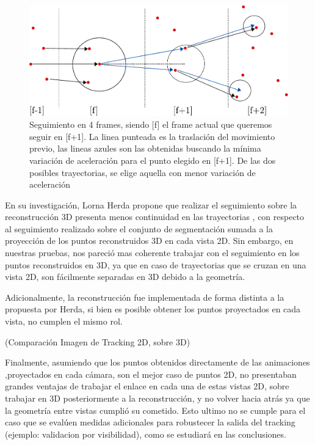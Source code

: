 \begin{figure}[hbt]
\begin{center}
\includegraphics[scale=0.8]{img/Tracking/tracking-eps-converted-to.pdf}
\end{center}
\caption{Seguimiento en 4 frames, siendo [f] el frame actual que queremos seguir en [f+1]. La linea punteada es la traslación del movimiento previo, las lineas azules son las obtenidas buscando la mínima variación de aceleración para el punto elegido en [f+1]. De las dos posibles trayectorias, se elige aquella con menor variación de aceleración}
\label{herda_00}
\end{figure}

En su investigación\cite{herda}, Lorna Herda propone que realizar el seguimiento sobre la reconstrucción 3D presenta menos continuidad en las trayectorias , con respecto al seguimiento realizado sobre el conjunto de segmentación sumada a la proyección de los puntos reconstruidos 3D en cada vista 2D. Sin embargo, en nuestras pruebas, nos pareció mas coherente trabajar con el seguimiento en los puntos reconstruidos en 3D, ya que en caso de trayectorias que se cruzan en una vista 2D, son fácilmente separadas en 3D debido a la geometría. 

Adicionalmente, la reconstrucción fue implementada de forma distinta a la propuesta por Herda, si bien es posible obtener los puntos proyectados en cada vista, no cumplen el mismo rol. 

(Comparación Imagen de Tracking 2D, sobre 3D)

Finalmente, asumiendo que los puntos obtenidos directamente de las animaciones ,proyectados en cada cámara, son el mejor caso de puntos 2D, no presentaban grandes ventajas de trabajar el enlace en cada una de estas vistas 2D, sobre trabajar en 3D posteriormente a la reconstrucción, y no volver hacia atrás ya que la geometría entre vistas cumplió su cometido. Esto ultimo no se cumple para el caso que se evalúen medidas adicionales para robustecer la salida del tracking (ejemplo: validacion por visibilidad), como se estudiará en las conclusiones.


